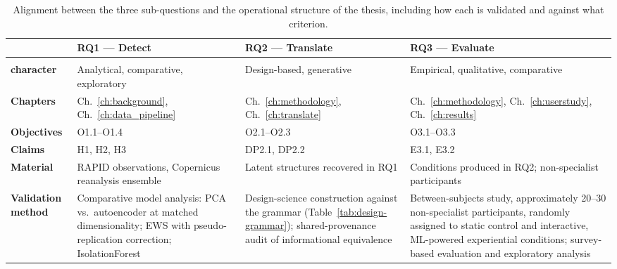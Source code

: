 \begin{table}[!ht]
    \centering
    \small
    \setlength{\tabcolsep}{5pt}
    \renewcommand{\arraystretch}{1.25}
    \caption{Alignment between the three sub-questions and the operational structure of the thesis, including how each is validated and against what criterion.}
    \label{tab:alignment}
    \begin{tabular}{
        @{}
        >{\RaggedRight\arraybackslash}p{2.7cm}
        >{\RaggedRight\arraybackslash}p{3.7cm}
        >{\RaggedRight\arraybackslash}p{3.7cm}
        >{\RaggedRight\arraybackslash}p{3.7cm}
        @{}
    }
        \toprule
        & \textbf{RQ1 --- Detect}
        & \textbf{RQ2 --- Translate}
        & \textbf{RQ3 --- Evaluate} \\
        \midrule
        \makecell[l]{\textbf{Epistemic}\\\textbf{character}}
            & Analytical, comparative, exploratory
            & Design-based, generative
            & Empirical, qualitative, comparative \\[0.5em]

        \textbf{Chapters}
            & Ch.~\ref{ch:background}, Ch.~\ref{ch:data_pipeline}
            & Ch.~\ref{ch:methodology}, Ch.~\ref{ch:translate}
            & Ch.~\ref{ch:methodology}, Ch.~\ref{ch:userstudy}, Ch.~\ref{ch:results} \\[0.5em]

        \textbf{Objectives}
            & O1.1--O1.4
            & O2.1--O2.3
            & O3.1--O3.3 \\[0.5em]

        \textbf{Claims}
            & H1, H2, H3
            & DP2.1, DP2.2
            & E3.1, E3.2 \\[0.5em]

        \textbf{Material}
            & RAPID observations, Copernicus reanalysis ensemble
            & Latent structures recovered in RQ1
            & Conditions produced in RQ2; non-specialist participants \\[0.5em]

        \textbf{Validation method}
            & Comparative model analysis: PCA vs.\ autoencoder at matched dimensionality; EWS with pseudo-replication correction; IsolationForest
            & Design-science construction against the grammar (Table~\ref{tab:design-grammar}); shared-provenance audit of informational equivalence
            & Between-subjects study, approximately 20--30 non-specialist participants, randomly assigned to static control and interactive, ML-powered experiential conditions; survey-based evaluation and exploratory analysis \\[0.5em]


\end{tabular}
\end{table}
